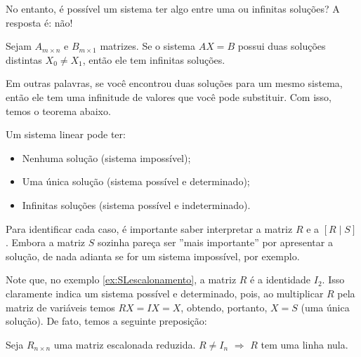 \documentclass[../main.tex]{subfiles}
\begin{document}
			No entanto, é possível um sistema ter algo entre uma ou infinitas soluções? A resposta é: não!
			\begin{proposicao}
				Sejam $A_{m\times n}$ e $B_{m\times 1}$ matrizes. Se o sistema $AX=B$ possui duas soluções distintas $X_0\neq X_1$, então ele tem infinitas soluções.
			\end{proposicao}
			Em outras palavras, se você encontrou duas soluções para um mesmo sistema, então ele tem uma infinitude de valores que você pode substituir. Com isso, temos o teorema abaixo.
			\begin{teorema}
				Um sistema linear pode ter:
				\begin{itemize}
					\item Nenhuma solução (sistema impossível);
					\item Uma única solução (sistema possível e determinado);
					\item Infinitas soluções (sistema possível e indeterminado).
				\end{itemize}
			\end{teorema}
			Para identificar cada caso, é importante saber interpretar a matriz $R$ e a $[R\mid S]$. Embora a matriz $S$ sozinha pareça ser ''mais importante'' por apresentar a solução, de nada adianta se for um sistema impossível, por exemplo.
			
			Note que, no exemplo \ref{ex:SLescalonamento}, a matriz $R$ é a identidade $I_2$. Isso claramente indica um sistema possível e determinado, pois, ao multiplicar $R$ pela matriz de variáveis temos $RX=IX=X$, obtendo, portanto, $X=S$ (uma única solução). De fato, temos a seguinte preposição:
			
			\begin{proposicao}
				Seja $R_{n\times n}$ uma matriz escalonada reduzida. $R\neq I_n$ $\Rightarrow$ $R$ tem uma linha nula.
			\end{proposicao} 
			
\end{document}
